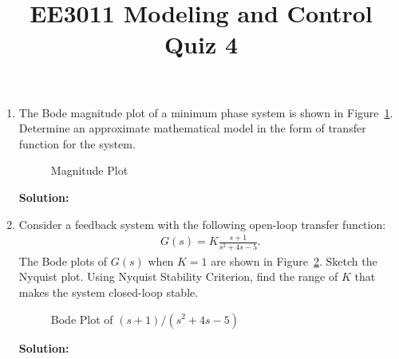 \documentclass{article}
\title{EE3011 Modeling and Control\\Quiz 4}
\date{}
\newlength\figureheight
\newlength\figurewidth
\newcommand{\tikzdir}[1]{tikz/#1.tikz}
\newcommand{\inputtikz}[1]{}}
\begin{document}
 \maketitle

\begin{enumerate}
\item The Bode magnitude plot of a minimum phase system is shown in Figure~\ref{fig:1}. Determine an approximate mathematical model in the form of transfer function for the system.
  \begin{figure}[ht]
\setlength\figureheight{8cm}
\setlength\figurewidth{14cm}
    \centering
    \inputtikz{Quiz21}
    \caption{Magnitude Plot\label{fig:1}}
  \end{figure}

  {\bf Solution:}
\newpage
\item Consider a feedback system with the following open-loop transfer function:
  \begin{align*}
    G(s) = K\frac{s+1}{s^2+4s-5}.
  \end{align*}
  The Bode plots of $G(s)$ when $K = 1$ are shown in Figure~\ref{fig:2}. Sketch the Nyquist plot. Using Nyquist Stability Criterion, find the range of $K$ that makes the system closed-loop stable.
  \begin{figure}[ht]
\setlength\figureheight{5cm}
\setlength\figurewidth{14cm}
    \centering
    \inputtikz{Quiz22}
    \caption{Bode Plot of $(s+1)/(s^2+4s-5)$\label{fig:2}}
  \end{figure}

  {\bf Solution:}
\end{enumerate}
\end{document}
